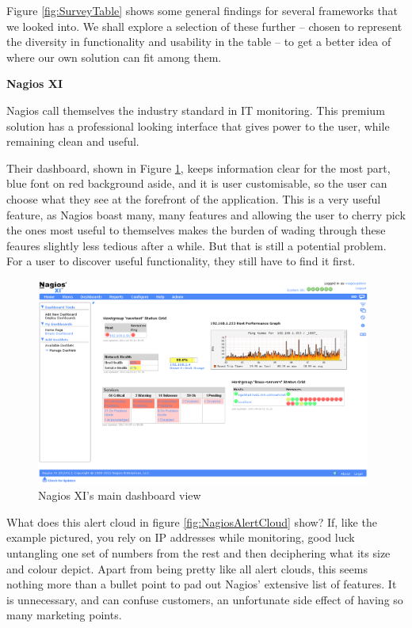 \documentclass{l3proj}
\begin{document}
Figure \ref{fig:SurveyTable} shows some general findings for several frameworks that we looked into. We shall explore a selection of these further -- chosen to represent the diversity in functionality and usability in the table -- to get a better idea of where our own solution can fit among them.

\textbf{Nagios XI} \cite{nagios}

Nagios call themselves the industry standard in IT monitoring. This premium solution has a professional looking interface that gives power to the user, while remaining clean and useful.

Their dashboard, shown in Figure \ref{fig:NagiosDash}, keeps information clear for the most part, blue font on red background aside, and it is user customisable, so the user can choose what they see at the forefront of the application. This is a very useful feature, as Nagios boast many, many features and allowing the user to cherry pick the ones most useful to themselves makes the burden of wading through these feaures slightly less tedious after a while. But that is still a potential problem. For a user to discover useful functionality, they still have to find it first.

\begin{figure}[H]
\centering
\includegraphics[width=110mm]{Competitors/NagiosXI_dashboard1.png}
\caption{Nagios XI's main dashboard view}
\label{fig:NagiosDash}
\end{figure}

What does this alert cloud in figure \ref{fig:NagiosAlertCloud} show? If, like the example pictured, you rely on IP addresses while monitoring, good luck untangling one set of numbers from the rest and then deciphering what its size and colour depict. Apart from being pretty like all alert clouds, this seems nothing more than a bullet point to pad out Nagios' extensive list of features.  It is unnecessary, and can confuse customers, an unfortunate side effect of having so many marketing points.
\end{document}
